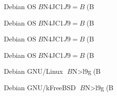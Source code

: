 {

\begin{frame}{Debian OS$B$N4JC1$J9=B$(B}
\end{frame}


\begin{frame}{Debian OS$B$N4JC1$J9=B$(B}
\end{frame}


\begin{frame}{Debian OS$B$N4JC1$J9=B$(B}
\end{frame}


\begin{frame}{Debian OS$B$N4JC1$J9=B$(B}
\end{frame}


\begin{frame}{Debian GNU/Linux $B$N>l9g(B}
\end{frame}

\begin{frame}{Debian GNU/kFreeBSD $B$N>l9g(B}
\end{frame}

}
